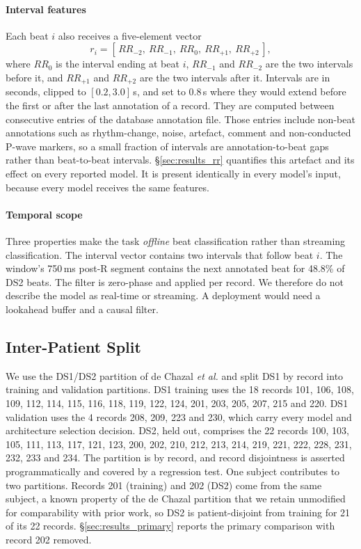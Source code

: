 \documentclass[preprint,12pt]{elsarticle}
\begin{document}
\paragraph{Interval features} Each beat $i$ also receives a five-element vector
\begin{equation}
r_i = [\,RR_{-2},\ RR_{-1},\ RR_{0},\ RR_{+1},\ RR_{+2}\,],
\end{equation}
where $RR_0$ is the interval ending at beat $i$, $RR_{-1}$ and $RR_{-2}$ are the two intervals before it, and $RR_{+1}$ and $RR_{+2}$ are the two intervals after it. Intervals are in seconds, clipped to $[0.2, 3.0]$\,s, and set to 0.8\,s where they would extend before the first or after the last annotation of a record. They are computed between consecutive entries of the database annotation file. Those entries include non-beat annotations such as rhythm-change, noise, artefact, comment and non-conducted P-wave markers, so a small fraction of intervals are annotation-to-beat gaps rather than beat-to-beat intervals. \S\ref{sec:results_rr} quantifies this artefact and its effect on every reported model. It is present identically in every model's input, because every model receives the same features.

\paragraph{Temporal scope} Three properties make the task \emph{offline} beat classification rather than streaming classification. The interval vector contains two intervals that follow beat $i$. The window's 750\,ms post-R segment contains the next annotated beat for 48.8\% of DS2 beats. The filter is zero-phase and applied per record. We therefore do not describe the model as real-time or streaming. A deployment would need a lookahead buffer and a causal filter.

\subsection{Inter-Patient Split}
\label{sec:split}
We use the DS1/DS2 partition of de Chazal \emph{et al.} \cite{chazal_automatic_2004} and split DS1 by record into training and validation partitions. DS1 training uses the 18 records 101, 106, 108, 109, 112, 114, 115, 116, 118, 119, 122, 124, 201, 203, 205, 207, 215 and 220. DS1 validation uses the 4 records 208, 209, 223 and 230, which carry every model and architecture selection decision. DS2, held out, comprises the 22 records 100, 103, 105, 111, 113, 117, 121, 123, 200, 202, 210, 212, 213, 214, 219, 221, 222, 228, 231, 232, 233 and 234. The partition is by record, and record disjointness is asserted programmatically and covered by a regression test. One subject contributes to two partitions. Records 201 (training) and 202 (DS2) come from the same subject, a known property of the de Chazal partition that we retain unmodified for comparability with prior work, so DS2 is patient-disjoint from training for 21 of its 22 records. \S\ref{sec:results_primary} reports the primary comparison with record 202 removed.
\end{document}
